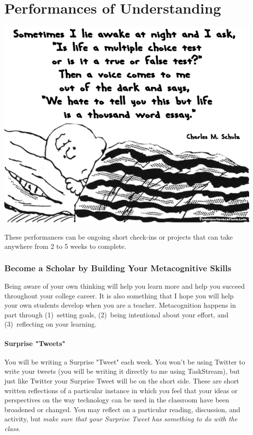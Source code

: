 \documentclass{tufte-handout}
\begin{document}
\part{Performances of Understanding}
\begin{marginfigure}%
	\begin{center}
  \includegraphics[width=0.5\linewidth]{lp-pic.png}
  \label{fig:lp-pic}
	\end{center}
\end{marginfigure}

 These performances can be ongoing short check-ins or projects that can take anywhere from 2 to 5 weeks to complete.

\section{Become a Scholar by Building Your Metacognitive Skills}
 Being aware of your own thinking will help you learn more and help you succeed throughout your college career. It is also something that I hope you will help your own students develop when you are a teacher. Metacognition happens in part through (1)~setting goals, (2)~being intentional about your effort, and (3)~reflecting on your learning.

\subsection{Surprise "Tweets"}
You will be writing a Surprise "Tweet" each week. You won't be using Twitter to write your tweets (you will be writing it directly to me using TaskStream), but just like Twitter your Surprise Tweet will be on the short side. These are short written reflections of a particular instance in which you feel that your ideas or perspectives on the way technology can be used in the classroom have been broadened or changed. You may reflect on a particular reading, discussion, and activity, but \emph{make sure that your Surprise Tweet has something to do with the class}.
\end{document}
